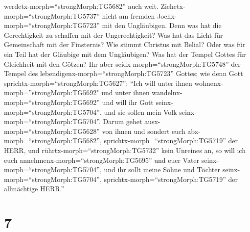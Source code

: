 werdetx-morph=``strongMorph:TG5682'' auch weit. 
Ziehetx-morph=``strongMorph:TG5737'' nicht am fremden
Jochx-morph=``strongMorph:TG5723'' mit den Ungläubigen. Denn was hat die
Gerechtigkeit zu schaffen mit der Ungerechtigkeit? Was hat das Licht für
Gemeinschaft mit der Finsternis?  Wie stimmt Christus mit
Belial? Oder was für ein Teil hat der Gläubige mit dem Ungläubigen?
 Was hat der Tempel Gottes für Gleichheit mit den Götzen?
Ihr aber seidx-morph=``strongMorph:TG5748'' der Tempel des
lebendigenx-morph=``strongMorph:TG5723'' Gottes; wie denn Gott
sprichtx-morph=``strongMorph:TG5627'': ``Ich will unter ihnen
wohnenx-morph=''strongMorph:TG5692" und unter ihnen
wandelnx-morph=``strongMorph:TG5692'' und will ihr Gott
seinx-morph=``strongMorph:TG5704'', und sie sollen mein Volk
seinx-morph=``strongMorph:TG5704''.  Darum gehet
ausx-morph=``strongMorph:TG5628'' von ihnen und sondert euch
abx-morph=``strongMorph:TG5682'', sprichtx-morph=``strongMorph:TG5719''
der HERR, und rührtx-morph=``strongMorph:TG5732'' kein Unreines an, so
will ich euch annehmenx-morph=``strongMorph:TG5695''  und
euer Vater seinx-morph=``strongMorph:TG5704'', und ihr sollt meine Söhne
und Töchter seinx-morph=``strongMorph:TG5704'',
sprichtx-morph=``strongMorph:TG5719'' der allmächtige HERR.''

\hypertarget{section-6}{%
\section{7}\label{section-6}}

